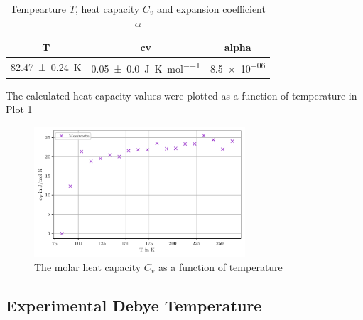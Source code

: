 \begin{table}[H]
	\centering
	\caption{Tempearture $T$, heat capacity $C_v$ and expansion coefficient $\alpha$}
	\begin{tabular}{c c c}
	\toprule
	T & cv & alpha\\
	\midrule
	\qty{82.47+-0.24}{\kelvin}& \qty{0.05+-0.0}{\joule \per \kelvin\per\mol}& \num{8.5e-06} \\
	\bottomrule
	\end{tabular}
	\end{table}

The calculated heat capacity values were plotted as a function of temperature in Plot \ref{fig:heat_capacity_plot}
\begin{figure}[H]
	\centering
	\includegraphics[width=0.7\textwidth]{build/Cv.pdf}
	\caption{The molar heat capacity $C_v$ as a function of temperature}
	\label{fig:heat_capacity_plot}
\end{figure}

\subsection{Experimental Debye Temperature}
\label{sec:experimental_debye_temperature}
